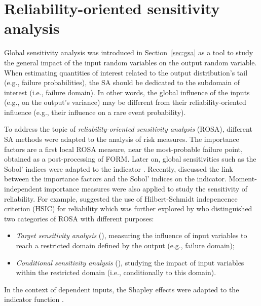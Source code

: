 \section{Reliability-oriented sensitivity analysis}\label{sec:bancs_rosa}

Global sensitivity analysis was introduced in Section~\ref{sec:gsa} as a tool to study the general impact of the input random variables on the output random variable. 
When estimating quantities of interest related to the output distribution's tail (e.g., failure probabilities), the SA should be dedicated to the subdomain of interest (i.e., failure domain). 
In other words, the global influence of the inputs (e.g., on the output's variance) may be different from their reliability-oriented influence (e.g., their influence on a rare event probability). 

To address the topic of \textit{reliability-oriented sensitivity analysis} (ROSA), different SA methods were adapted to the analysis of risk measures. 
The importance factors are a first local ROSA measure, near the most-probable failure point, obtained as a post-processing of FORM. 
Later on, global sensitivities such as the Sobol' indices were adapted to the indicator \citet{wei_2012_rosa,chabridon_2018_thesis,perrin_2019_rosa}. 
Recently, \citet{papaioannou_2021_rosa_form} discussed the link between the importance factors and the Sobol' indices on the indicator. 
Moment-independent importance measures were also applied to study the sensitivity of reliability. 
For example, \citet{daveiga_2015} suggested the use of Hilbert-Schmidt indepencence criterion (HSIC) for reliability which was further explored by \citet{marrel_chabridon_2021} who distinguished two categories of ROSA with different purposes: 
\begin{itemize}
    \item \textit{Target sensitivity analysis} (), measuring the influence of input variables to reach a restricted domain defined by the output (e.g., failure domain);
    \item \textit{Conditional sensitivity analysis} (), studying the impact of input variables within the restricted domain (i.e., conditionally to this domain).
\end{itemize}
In the context of dependent inputs, the Shapley effects were adapted to the indicator function \citep{ilidrissi_2021_rosa,demange_2023_ijuq}. 

